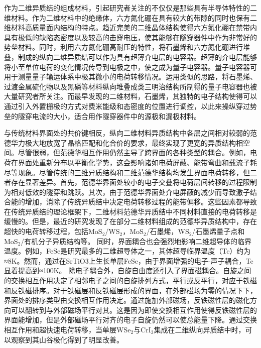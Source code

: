 作为二维异质结的组成材料，引起研究者关注的不仅仅是那些具有半导体特性的二维材料。作为二维材料中的绝缘体，六方氮化硼在具有较大的带隙的同时也保有二维材料高质量面内结构的特点。趋近完美的二维晶体结构使得六方氮化硼在禁带内具有极低的缺陷态密度以及较高的击穿电压，使其能够在隧穿器件中作为非常好的势垒材料。同时，利用六方氮化硼高耐压的特性，将石墨烯和六方氮化硼进行堆叠，制成的纵向二维异质结可以作为具有超薄介电层的电容器。超薄的介电层能够将小至单位电荷的变化情况传导到电极之中，使之成为量子电容器。量子电容器可用于测量量子输运体系中极其微小的电荷转移情况。运用类似的思路，将石墨烯、过渡金属硫化物以及黑磷等材料纵向堆叠成类三明治结构所制得的量子电容器也被大量研究者所关注。而最早发现的二维材料，石墨烯，其独特的电子结构使得可以通过引入外置栅极的方式对费米能级和态密度的位置进行调控，以此来操纵穿过势垒的隧穿电流的大小，适合用作隧穿器件中的源极和漏极材料。

与传统材料界面处的共价键相反，纵向二维材料异质结构中各层之间相对较弱的范德华力极大地放宽了晶格匹配和化合价的要求，最终实现了更宽的异质结构相空间。尽管很弱，但范德华相互作用仍然主导了跨界面的各种类型的耦合。例如，电荷在界面处重新分布以平衡化学势，这会影响诸如电荷屏蔽、能带弯曲和载流子耗尽等现象。尽管传统的三维异质结构和二维范德华结构均发生界面电荷转移，但二者存在显著差异。首先，范德华界面处较小的电子交叠将电荷层间转移的过程限制为相对低效的隧穿和跳跃。其次，由于范德华界面处介电屏蔽的减少而导致激子结合能的增加，消除了传统异质结中决定电荷转移过程的能带偏移。这些因素都导致在传统异质结的理论框架下，二维材料范德华异质结中不同材料直接的电荷转移是缓慢的。但是，最近的研究发现了在部分二维材料组成的范德华异质结构中，存在超快的电荷转移过程，包括MoS$_2$/WS$_2$，MoS$_2$/石墨烯，WS$_2$/石墨烯量子点和MoS$_2$/有机分子异质结构等。%
同时，界面耦合也会强烈地影响二维超导体的临界温度。例如，FeSe是研究最多的二维超导体之一，其体超导临界温度（Tc）约为≈8K。然而，通过在SrTiO3上生长单层FeSe，由于界面增强的电子-声子耦合，Tc显着提高到≈100K。%
除电子耦合外，自旋自由度还引入了界面磁耦合。自旋之间的交换相互作用决定了相邻电子之间的自旋排列方式，平行或反平行，对应于铁磁和反铁磁排序。对于铁磁层和反铁磁层形成的界面，在外部磁场为零的情况下下，界面处的排序类型由交换相互作用决定。通过施加外部磁场，反铁磁性层的磁化方向可以翻转到与外部磁场平行对其。这是因为即使交换相互作用使得反铁磁性层的界面能增加，但是外部磁场平行对齐的电子自旋仍然可以使总能量下降。通过交换相互作用和超快速电荷转移，当单层WSe$_2$与CrI$_3$集成在二维纵向异质结中时，可以观察到其山谷极化得到了明显改善。%

